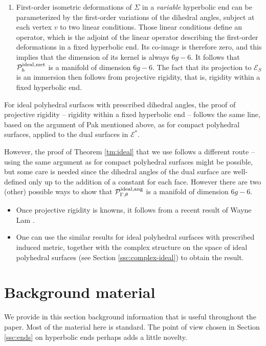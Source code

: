 \documentclass[notitlepage,twoside,a4paper]{amsart}
\newcommand{\Pidang}{\cP^{\rm ideal,ang}_{\Gamma,\theta}}
\newcommand{\Pidmet}{\cP^{\rm ideal,met}_{h}}
\theoremstyle{named}
\newcommand{\cE}{{\mathcal E}}
\newcommand{\cP}{{\mathcal P}}
\begin{document}
\begin{enumerate}
\item First-order isometric deformations of $\Sigma$ in a {\em variable} hyperbolic end can be parameterized by the first-order variations of the dihedral angles, subject at each vertex $v$ to two linear conditions. Those linear conditions define an operator, which is the adjoint of the linear operator describing the first-order deformations in a fixed hyperbolic end. Its co-image is therefore zero, and this implies that the dimension of its kernel is always $6g-6$. It follows that $\Pidmet$ is a manifold of dimension $6g-6$. The fact that its projection to $\cE_S$ is an immersion then follows from projective rigidity, that is, rigidity within a fixed hyperbolic end. 
\end{enumerate}

For ideal polyhedral surfaces with prescribed dihedral angles, the proof of projective rigidity -- rigidity within a fixed hyperbolic end -- follows the same line, based on the argument of Pak \cite{pak:short} mentioned above, as for compact polyhedral surfaces, applied to the dual surfaces in $\cE^*$.

However, the proof of Theorem \ref{tm:ideal} that we use follows a different route -- using the same  argument as for compact polyhedral surfaces might be possible, but some care is needed since the dihedral angles of the dual surface are well-defined only up to the addition of a constant for each face. However there are two (other) possible ways to show that $\Pidang$ is a manifold of dimension $6g-6$.
\begin{itemize}
\item Once projective rigidity is knowns, it follows from a recent result of Wayne Lam \cite[Cor. 1.4]{lam:pullback}.
\item One can use the similar results for ideal polyhedral surfaces with prescribed induced metric, together with the complex structure on the space of ideal polyhedral surfaces (see Section \ref{ssc:complex-ideal}) to obtain the result.
\end{itemize}

\section{Background material}
\label{sc:background}

We provide in this section background information that is useful throughout the paper. Most of the material here is standard. The point of view chosen in Section \ref{ssc:ends} on hyperbolic ends perhaps adds a little novelty.
\end{document}
